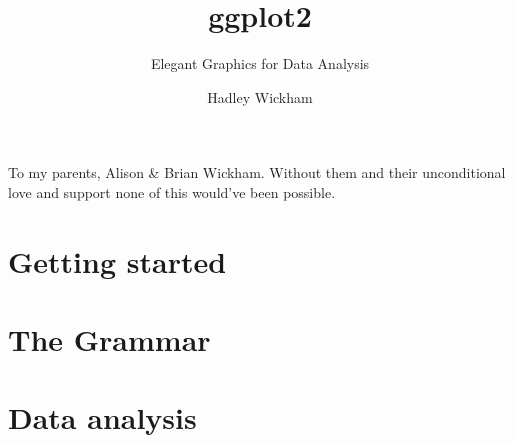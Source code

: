 \documentclass[graybox,envcountchap,sectrefs]{svmono}
\title{ggplot2}
\subtitle{Elegant Graphics for Data Analysis}
\author{Hadley Wickham}
\begin{document}
\frontmatter
\maketitle

\begin{dedication}
To my parents, Alison \& Brian Wickham. Without them and their unconditional
love and support none of this would've been possible.
\end{dedication}



\tableofcontents

\mainmatter

\part{Getting started}





\part{The Grammar}







\part{Data analysis}






\backmatter

\cleardoublepage
{}
\printindex

\printindex[code]
\end{document}
